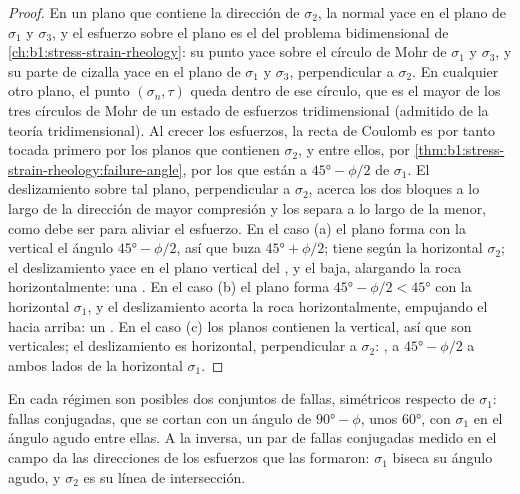 \begin{proof}
En un plano que contiene la dirección de $\sigma_2$, la normal yace en el plano de $\sigma_1$ y $\sigma_3$, y el esfuerzo sobre
el plano es el del problema bidimensional de \cref{ch:b1:stress-strain-rheology}: su punto yace sobre el círculo de Mohr de
$\sigma_1$ y $\sigma_3$, y su parte de cizalla yace en el plano de $\sigma_1$ y $\sigma_3$, perpendicular a $\sigma_2$. En
cualquier otro plano, el punto $(\sigma_n, \tau)$ queda dentro de ese círculo, que es el mayor de los tres círculos de Mohr de
un estado de esfuerzos tridimensional (admitido de la teoría tridimensional). Al crecer los esfuerzos, la recta de Coulomb es
por tanto tocada primero por los planos que contienen $\sigma_2$, y entre ellos, por \cref{thm:b1:stress-strain-rheology:failure-angle},
por los que están a $\ang{45} - \phi/2$ de $\sigma_1$. El deslizamiento sobre tal plano, perpendicular a $\sigma_2$, acerca los
dos bloques a lo largo de la dirección de mayor compresión y los separa a lo largo de la menor, como debe ser para aliviar el
esfuerzo. En el caso (a) el plano forma con la vertical el ángulo $\ang{45} - \phi/2$, así que buza $\ang{45} + \phi/2$; tiene
 según la horizontal $\sigma_2$; el deslizamiento yace en el plano vertical del , y el  baja,
alargando la roca horizontalmente: una . En el caso (b) el plano forma $\ang{45} - \phi/2 < \ang{45}$ con la
horizontal $\sigma_1$, y el deslizamiento acorta la roca horizontalmente, empujando el  hacia arriba: un
. En el caso (c) los planos contienen la vertical, así que son verticales; el deslizamiento es horizontal,
perpendicular a $\sigma_2$: , a $\ang{45} - \phi/2$ a ambos lados de la horizontal $\sigma_1$.
\end{proof}

En cada régimen son posibles dos conjuntos de fallas, simétricos respecto de $\sigma_1$: fallas conjugadas, que se cortan con
un ángulo de $\ang{90} - \phi$, unos \ang{60}, con $\sigma_1$ en el ángulo agudo entre ellas. A la inversa, un par de fallas
conjugadas medido en el campo da las direcciones de los esfuerzos que las formaron: $\sigma_1$ biseca su ángulo agudo, y
$\sigma_2$ es su línea de intersección.

